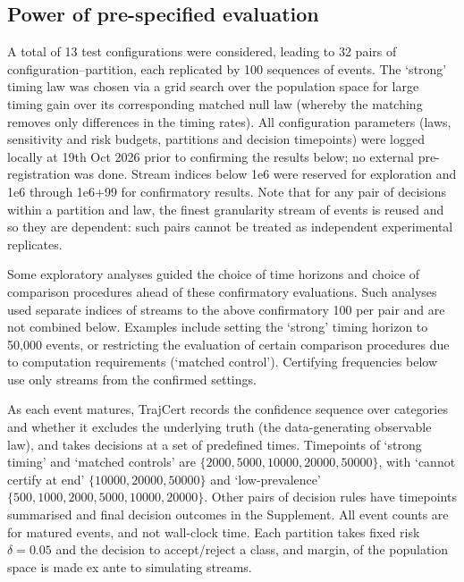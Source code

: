 \subsection{Power of pre-specified evaluation}
A total of 13 test configurations were considered, leading to 32 pairs of configuration--partition, each replicated by 100 sequences of events. The `strong' timing law was chosen via a grid search over the population space for large timing gain over its corresponding matched null law (whereby the matching removes only differences in the timing rates). All configuration parameters (laws, sensitivity and risk budgets, partitions and decision timepoints) were logged locally at 19th Oct 2026 prior to confirming the results below; no external pre-registration was done. Stream indices below 1e6 were reserved for exploration and 1e6 through 1e6+99 for confirmatory results. Note that for any pair of decisions within a partition and law, the finest granularity stream of events is reused and so they are dependent: such pairs cannot be treated as independent experimental replicates.

Some exploratory analyses guided the choice of time horizons and choice of comparison procedures ahead of these confirmatory evaluations. Such analyses used separate indices of streams to the above confirmatory 100 per pair and are not combined below. Examples include setting the `strong' timing horizon to 50,000 events, or restricting the evaluation of certain comparison procedures due to computation requirements (`matched control'). Certifying frequencies below use only streams from the confirmed settings.

As each event matures, TrajCert records the confidence sequence over categories and whether it excludes the underlying truth (the data-generating observable law), and takes decisions at a set of predefined times. Timepoints of `strong timing' and `matched controls' are $\{2000,5000,10000,20000,50000\}$, with `cannot certify at end' $\{10000,20000,50000\}$ and `low-prevalence' $\{500, 1000, 2000, 5000, 10000, 20000\}$. Other pairs of decision rules have timepoints summarised and final decision outcomes in the Supplement. All event counts are for matured events, and not wall-clock time. Each partition takes fixed risk $\delta=0.05$ and the decision to accept/reject a class, and margin, of the population space is made ex ante to simulating streams.


